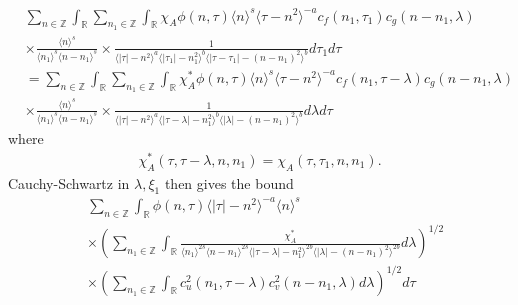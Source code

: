 \documentclass[12pt,reqno]{amsart}
\numberwithin{equation}{section}  %
\numberwithin{figure}{section}
\newcommand{\rr}{\mathbb{R}}
\newcommand{\zz}{\mathbb{Z}}
\theoremstyle{plain}
\theoremstyle{definition}
\theoremstyle{remark}
\begin{document}
\begin{equation*}
	\begin{split}
    & \sum_{n \in \zz} \int_{\rr}   \sum_{n_1 \in \zz}
    \int_{\rr} \chi_{A}
    \phi(n, \tau) \langle n \rangle^s \langle \tau - n^{2} \rangle^{-a}
  c_f(n_1, \tau_1)
		c_g(n - n_1, \lambda )
		\\
    & \times \frac{\langle n \rangle ^{s}}{\langle n_{1} \rangle ^{s} \langle
    n-n_{1} \rangle ^{s}} \times \frac{1}{\langle |\tau| - n^{2} \rangle
    ^{a}\langle |\tau_{1}|-n_{1}^{2} \rangle ^{b}\langle | \tau -
    \tau_{1}|-(n - n_{1})^{2}
    \rangle ^{b}} d \tau_1 d \tau
    \\
    & = \sum_{n \in \zz} \int_{\rr}   \sum_{n_1 \in \zz}
    \int_{\rr} \chi^{*}_{A}
    \phi(n, \tau) \langle n \rangle^s \langle \tau - n^{2} \rangle^{-a}
  c_f(n_1, \tau - \lambda)
		c_g(n - n_1, \lambda )
		\\
    & \times \frac{\langle n \rangle ^{s}}{\langle n_{1} \rangle ^{s} \langle
    n-n_{1} \rangle ^{s}} \times \frac{1}{\langle |\tau| - n^{2} \rangle
    ^{a}\langle |\tau - \lambda|-n_{1}^{2} \rangle ^{b}\langle |
    \lambda|-(n - n_{1})^{2}
    \rangle ^{b}} d \lambda  d \tau
	\end{split}
\end{equation*}
where 
%
%
\begin{equation}
  \label{change-of-var}
\begin{split}
  \chi^{*}_{A}(\tau, \tau - \lambda, n, n_{1}) =
  \chi_{A}(\tau, \tau_{1}, n, n_{1}).
\end{split}
\end{equation}
%
%
Cauchy-Schwartz in
$\lambda, \xi_{1}$ then gives the bound
%
%
%
\begin{equation}
	\label{10g*}
	\begin{split}
    & \sum_{n \in \zz} \int_{\rr} \phi(n, \tau) \langle | \tau | - n^{2} \rangle
    ^{-a} \langle n \rangle ^{s}
    \\
    & \times \left( \sum_{n_{1} \in \zz} \int_{\rr}
    \frac{\chi^{*}_{A}}{\langle n_{1} \rangle ^{2s} \langle n-n_{1} \rangle ^{2s} \langle |
    \tau - \lambda | - n_{1}^{2}\rangle ^{2b} \langle | \lambda | -
    (n - n_{1})^{2} \rangle ^{2b}} d \lambda \right)^{1/2}
    \\
    & \times \left( \sum_{n_{1} \in \zz} \int_{\rr} c_{u}^{2}(n_{1}, \tau - \lambda)
    c_{v}^{2}(n - n_{1}, \lambda) d \lambda \right)^{1/2} d \tau
  \end{split}
\end{equation}
%
\end{document}
